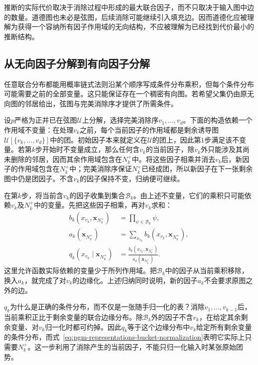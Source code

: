 推断的实际代价取决于消除过程中形成的最大联合因子，而不只取决于输入图中边的数量。道德图也未必是弦图，后续消除可能继续引入填充边。因而道德化应被理解为获得一个容纳所有因子作用域的无向结构，不应被理解为已经找到代价最小的推断结构。

\subsection{从无向因子分解到有向因子分解}
\label{sec:pgm-representations-undirected-to-directed}

任意联合分布都能用概率链式法则沿某个顺序写成条件分布乘积，但每个条件分布可能需要之前的全部变量。这只能保证存在一个稠密有向图。若希望父集仍由原无向图的邻居给出，弦图与完美消除序才提供了所需条件。

设$p$严格为正并已在弦图$\mathcal{U}$上分解，选择完美消除序$v_1,\ldots,v_d$。下面的构造依赖一个作用域不变量：在处理$v_k$之前，每个当前因子的作用域都是剩余诱导图$\mathcal{U}[\{v_k,\ldots,v_d\}]$中的团。初始因子本来就定义在$\mathcal{U}$的团上，因此第$1$步满足该不变量。若第$k$步开始时不变量成立，那么任何含$v_k$的当前因子，除$v_k$外只能涉及其尚未删除的邻居，因而其余作用域包含在$N_k^+$中。将这些因子相乘并消去$v_k$后，新因子的作用域包含在$N_k^+$中；完美消除序保证$N_k^+$已经成团，所以新因子在下一张剩余图中仍是团因子。不含$v_k$的因子保持不变，归纳便可继续。

在第$k$步，将当前含$v_k$的因子收集到集合$\mathcal{B}_k$。由上述不变量，它们的乘积只可能依赖$v_k$及$N_k^+$中的变量。先把这些因子相乘，再对$v_k$求和：
\begin{equation}
  \begin{aligned}
    b_k(x_{v_k},\bm{x}_{N_k^+})
    &=\prod_{\psi\in\mathcal{B}_k}\psi,\\
    a_k(\bm{x}_{N_k^+})
    &=\sum_{x_{v_k}}b_k(x_{v_k},\bm{x}_{N_k^+}),\\
    q_k(x_{v_k}\mid\bm{x}_{N_k^+})
    &=\frac{b_k(x_{v_k},\bm{x}_{N_k^+})}
    {a_k(\bm{x}_{N_k^+})}.
  \end{aligned}
  \label{eq:pgm-representations-bucket-normalization}
\end{equation}
这里允许函数实际依赖的变量少于所列作用域。把$\mathcal{B}_k$中的因子从当前乘积移除，换入$a_k$，就完成了对$v_k$的边缘化。上述归纳同时说明，新的因子$a_k$不会要求原图之外的边。

$q_k$为什么是正确的条件分布，而不仅是一张随手归一化的表？消除$v_1,\ldots,v_{k-1}$后，当前乘积正比于剩余变量的联合边缘分布。除$\mathcal{B}_k$外的因子不含$v_k$，在给定其余剩余变量、对$v_k$归一化时都可约掉。因此$q_k$等于这个边缘分布中$v_k$给定所有剩余变量的条件分布，而式~\eqref{eq:pgm-representations-bucket-normalization}表明它实际上只需要$N_k^+$。这一步利用了消除产生的当前因子，不能只归一化输入时某张原始团势。

